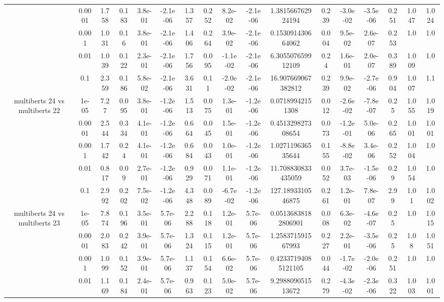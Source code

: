 \begin{tabular}{|c|c|c|c|c|c|c|c|c|c|c|c|c|c|c|c|c|}
 & 0.0001 & 1.758 & 0.183 & 3.8e-01 & -2.1e-06 & 1.357 & 0.252 & 8.2e-02 & -2.1e-06 & 1.381566762924194 & 0.239 & -3.0e-02 & -3.5e-06 & 0.251 & 1.047 & 1.024 \\
 & 0.001 & 1.031 & 0.16 & 3.8e-01 & -2.1e-06 & 1.406 & 0.264 & 3.9e-02 & -2.1e-06 & 0.153091430664062 & 0.004 & 9.5e-02 & 2.6e-07 & 0.253 & 1.0 & 1.0 \\
 & 0.01 & 1.039 & 0.122 & 2.3e-01 & -2.1e-06 & 1.756 & 0.095 & -1.1e-02 & -2.1e-06 & 6.305507659912109 & 0.24 & 1.6e-01 & 2.0e-07 & 0.389 & 1.009 & 1.0 \\
 & 0.1 & 2.359 & 0.186 & 5.8e-02 & -2.1e-06 & 3.631 & 0.11 & -2.0e-02 & -2.1e-06 & 16.907669067382812 & 0.239 & 9.9e-02 & -2.7e-06 & 0.904 & 1.007 & 1.1 \\
\hline
\multirow{5}{*}{multiberts 24 vs multiberts 22} & 1e-05 & 7.27 & 0.095 & 3.8e-01 & -1.2e-06 & 1.513 & 0.075 & 1.3e-01 & -1.2e-06 & 0.07189942151308 & 0.012 & -2.6e-02 & -7.8e-07 & 0.25 & 1.055 & 1.019 \\
 & 0.0001 & 2.544 & 0.334 & 4.1e-01 & -1.2e-06 & 0.664 & 0.045 & 1.5e-01 & -1.2e-06 & 0.451329827308654 & 0.073 & -1.2e-01 & 5.0e-06 & 0.265 & 1.001 & 1.001 \\
 & 0.001 & 1.742 & 0.24 & 4.1e-01 & -1.2e-06 & 0.684 & 0.043 & 1.0e-01 & -1.2e-06 & 1.027119636535644 & 0.155 & -8.8e-02 & 3.4e-06 & 0.252 & 1.004 & 1.0 \\
 & 0.01 & 0.817 & 0.09 & 2.7e-01 & -1.2e-06 & 0.929 & 0.071 & 1.1e-01 & -1.2e-06 & 11.708830833435059 & 0.052 & 3.7e-03 & -1.5e-06 & 0.29 & 1.054 & 1.0 \\
 & 0.1 & 2.992 & 0.202 & 7.5e-02 & -1.2e-06 & 4.348 & 0.089 & -6.7e-02 & -1.2e-06 & 127.1893310546875 & 0.261 & 1.2e-01 & 7.8e-07 & 2.99 & 1.01 & 1.002 \\
\hline
\multirow{5}{*}{multiberts 24 vs multiberts 23} & 1e-05 & 7.874 & 0.196 & 3.5e-01 & 5.7e-06 & 2.288 & 0.118 & 1.2e-01 & 5.7e-06 & 0.05136838182806901 & 0.008 & 6.3e-02 & -4.6e-07 & 0.25 & 1.0 & 1.015 \\
 & 0.0001 & 2.083 & 0.242 & 3.9e-01 & 5.7e-06 & 1.324 & 0.115 & 1.2e-01 & 5.7e-06 & 1.258371591567993 & 0.227 & 2.2e-01 & -3.5e-06 & 0.25 & 1.08 & 1.051 \\
 & 0.001 & 1.099 & 0.152 & 3.9e-01 & 5.7e-06 & 1.137 & 0.154 & 6.6e-02 & 5.7e-06 & 0.42337194085121105 & 0.044 & -1.7e-02 & -2.0e-06 & 0.251 & 1.0 & 1.0 \\
 & 0.01 & 1.169 & 0.184 & 2.4e-01 & 5.7e-06 & 0.963 & 0.123 & 5.0e-02 & 5.7e-06 & 9.298809051513672 & 0.279 & -4.3e-02 & -2.3e-06 & 0.322 & 1.003 & 1.001 \\

\end{tabular}
